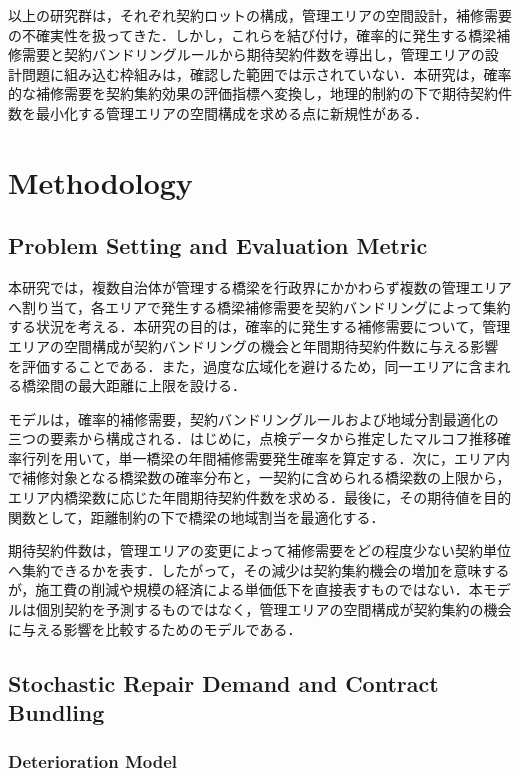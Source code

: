 \documentclass[Journal,letterpaper,InsideFigs,NoLineNumbers]{ascelike-new}
\begin{document}
以上の研究群は，それぞれ契約ロットの構成，管理エリアの空間設計，補修需要の不確実性を扱ってきた．しかし，これらを結び付け，確率的に発生する橋梁補修需要と契約バンドリングルールから期待契約件数を導出し，管理エリアの設計問題に組み込む枠組みは，確認した範囲では示されていない．本研究は，確率的な補修需要を契約集約効果の評価指標へ変換し，地理的制約の下で期待契約件数を最小化する管理エリアの空間構成を求める点に新規性がある．

\section{Methodology}

\subsection{Problem Setting and Evaluation Metric}

本研究では，複数自治体が管理する橋梁を行政界にかかわらず複数の管理エリアへ割り当て，各エリアで発生する橋梁補修需要を契約バンドリングによって集約する状況を考える．本研究の目的は，確率的に発生する補修需要について，管理エリアの空間構成が契約バンドリングの機会と年間期待契約件数に与える影響を評価することである．また，過度な広域化を避けるため，同一エリアに含まれる橋梁間の最大距離に上限を設ける．

モデルは，確率的補修需要，契約バンドリングルールおよび地域分割最適化の三つの要素から構成される．はじめに，点検データから推定したマルコフ推移確率行列を用いて，単一橋梁の年間補修需要発生確率を算定する．次に，エリア内で補修対象となる橋梁数の確率分布と，一契約に含められる橋梁数の上限から，エリア内橋梁数に応じた年間期待契約件数を求める．最後に，その期待値を目的関数として，距離制約の下で橋梁の地域割当を最適化する．

期待契約件数は，管理エリアの変更によって補修需要をどの程度少ない契約単位へ集約できるかを表す．したがって，その減少は契約集約機会の増加を意味するが，施工費の削減や規模の経済による単価低下を直接表すものではない．本モデルは個別契約を予測するものではなく，管理エリアの空間構成が契約集約の機会に与える影響を比較するためのモデルである．

\subsection{Stochastic Repair Demand and Contract Bundling}

\subsubsection{Deterioration Model}
\end{document}
